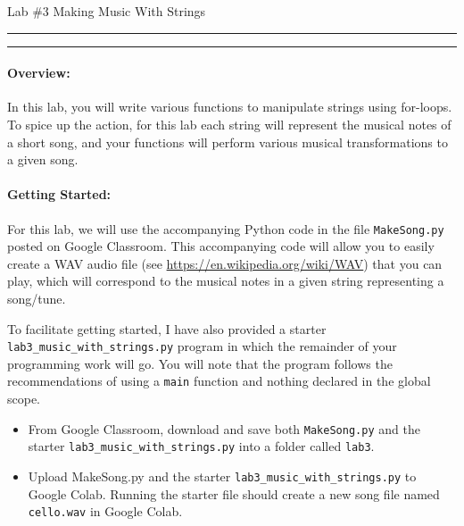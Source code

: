 \documentclass[10pt]{article}
\begin{document}
  \thispagestyle{empty}
  \def\cpp{C{\tt ++}\xspace}

  \begin{bf}
      Lab \#3
      \hfill 
      Making Music With Strings
      \hfill
  \end{bf}

  \vspace*{10pt} \hrule \vspace*{1pt} \hrule

  \vspace*{-10pt}
  \paragraph{Overview:} 

  \newcommand{\prog}{{\tt lab3\_music\_with\_strings.py}\xspace}

  In this lab, you will write various functions to manipulate strings using
  for-loops.  
  To spice up the action, for this lab each string will represent the musical
  notes of a short song, and your functions will perform various musical
  transformations to a given song.  

  \vspace*{-20pt}
  
  \paragraph{Getting Started:}
    For this lab, we will use the accompanying Python code in
    the file {\tt MakeSong.py} posted on Google Classroom.
    This accompanying code will allow you to easily create a WAV audio file
    (see \url{https://en.wikipedia.org/wiki/WAV}) that you can play, which will
    correspond to the musical notes in a given string representing a song/tune.

    To facilitate getting started, I have also provided a starter 
    \prog
    program in which the remainder of your
    programming work will go.
    You will note that the program follows the recommendations of using a {\tt main}
    function and nothing declared in the global scope.

    \vspace*{-6pt}
    \begin{itemize}
        \item From Google Classroom, download and save both {\tt MakeSong.py} and the
            starter \prog into a folder called {\tt lab3}.
        \item Upload MakeSong.py and the starter \prog to Google Colab. Running the starter file
            should create a new song file named {\tt cello.wav} in Google Colab.
    \end{itemize}
\end{document}
